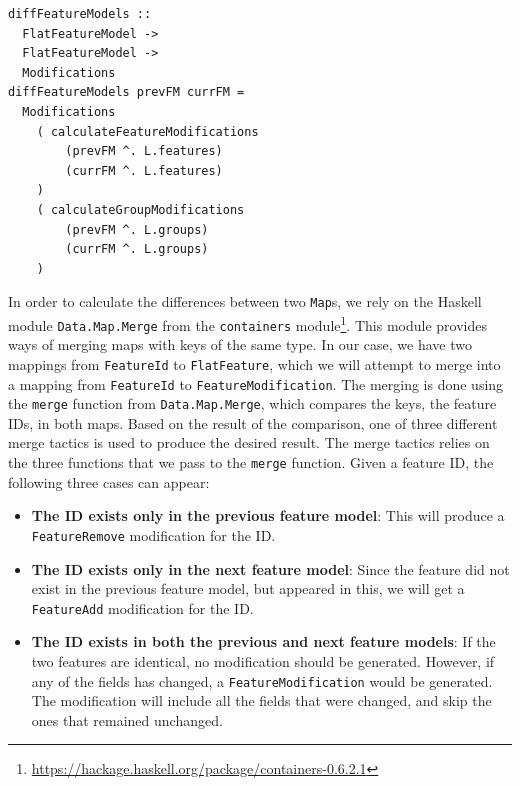 \documentclass[a4paper,english]{ifimaster}
\begin{document}
\begin{verbatim}
diffFeatureModels :: 
  FlatFeatureModel -> 
  FlatFeatureModel -> 
  Modifications
diffFeatureModels prevFM currFM =
  Modifications
    ( calculateFeatureModifications
        (prevFM ^. L.features)
        (currFM ^. L.features)
    )
    ( calculateGroupModifications
        (prevFM ^. L.groups)
        (currFM ^. L.groups)
    )
\end{verbatim}

In order to calculate the differences between two \texttt{Map}s, we rely on the Haskell module \texttt{Data.Map.Merge} from the \texttt{containers} module\footnote{\url{https://hackage.haskell.org/package/containers-0.6.2.1}}. This module provides ways of merging maps with keys of the same type. In our case, we have two mappings from \texttt{FeatureId} to \texttt{FlatFeature}, which we will attempt to merge into a mapping from \texttt{FeatureId} to \texttt{FeatureModification}. The merging is done using the \texttt{merge} function from \texttt{Data.Map.Merge}, which compares the keys, the feature IDs, in both maps. Based on the result of the comparison, one of three different merge tactics is used to produce the desired result. The merge tactics relies on the three functions that we pass to the \texttt{merge} function. Given a feature ID, the following three cases can appear:

\begin{itemize}
  \item \textbf{The ID exists only in the previous feature model}: This will produce a \texttt{FeatureRemove} modification for the ID.
  \item \textbf{The ID exists only in the next feature model}: Since the feature did not exist in the previous feature model, but appeared in this, we will get a \texttt{FeatureAdd} modification for the ID.
  \item \textbf{The ID exists in both the previous and next feature models}: If the two features are identical, no modification should be generated. However, if any of the fields has changed, a \texttt{FeatureModification} would be generated. The modification will include all the fields that were changed, and skip the ones that remained unchanged.
\end{itemize}
\end{document}

